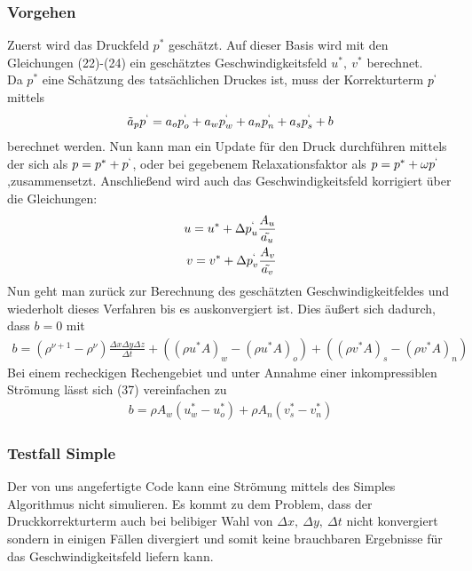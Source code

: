 \documentclass{article}
\begin{document}
\subsubsection{Vorgehen}
Zuerst wird das Druckfeld $p^*$ geschätzt. Auf dieser Basis wird mit den Gleichungen (22)-(24) ein
geschätztes Geschwindigkeitsfeld $u^*,\ v^*$ berechnet. \\
Da $p^*$ eine Schätzung des tatsächlichen Druckes ist,
muss der Korrekturterm $p^`$ mittels 
\begin{align}
\tilde{a}_p p^`= a_o  p^`_o + a_w p^`_w +a_n  p^`_n +a_s  p^`_s +b
\end{align}
berechnet werden.
Nun kann man ein Update für den Druck durchführen mittels der sich als $p = p^* +p^`$, oder bei gegebenem Relaxationsfaktor
als $p = p^* +\omega p^`$,zusammensetzt.
Anschließend wird auch das Geschwindigkeitsfeld korrigiert über die Gleichungen:
\begin{align}
u = u^*+\Delta p^`_u \frac{A_u}{\tilde{a_u}}\\
v = v^*+\Delta p^`_v \frac{A_v}{\tilde{a_v}}
\end{align}
Nun geht man zurück zur Berechnung des geschätzten Geschwindigkeitfeldes und wiederholt dieses Verfahren bis es auskonvergiert ist.
Dies äußert sich dadurch, dass $b=0$ mit 
\begin{align}
b = (\rho^{\nu+1}-\rho^{\nu}) \frac{\Delta x \Delta y \Delta z}{\Delta t} 
+((\rho u^* A)_w-(\rho u^* A)_o)+((\rho v^* A)_s-(\rho v^* A)_n)
\end{align}
Bei einem recheckigen Rechengebiet und unter Annahme einer inkompressiblen Strömung lässt sich (37) vereinfachen zu
\begin{align}
b = \rho A_w (u^*_w-u^*_o) +\rho A_n (v^*_s-v^*_n)
\end{align}

\subsubsection{Testfall Simple}
Der von uns angefertigte Code kann eine Strömung mittels des Simples Algorithmus nicht simulieren. Es kommt zu dem Problem,
dass der Druckkorrekturterm auch bei belibiger Wahl von $\Delta x,\ \Delta y,\ \Delta t$ nicht konvergiert sondern in
einigen Fällen divergiert und somit keine brauchbaren Ergebnisse für das Geschwindigkeitsfeld liefern kann.
\end{document}
